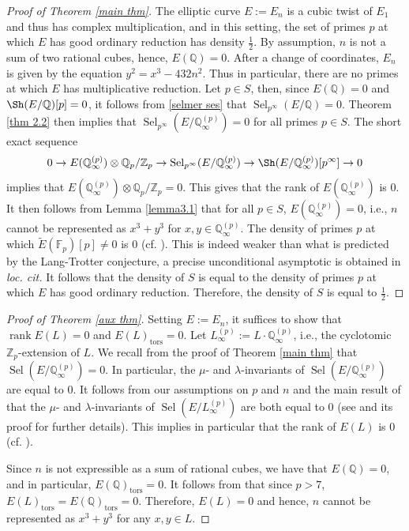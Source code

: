 \documentclass[11pt]{amsart}
\newcommand{\Z}{\mathbb{Z}}
\newcommand{\Q}{\mathbb{Q}}
\newcommand{\F}{\mathbb{F}}
\newcommand{\op}[1]{\operatorname{#1}}
\numberwithin{equation}{section}
\begin{document}
\begin{proof}[Proof of Theorem \ref{main thm}]
    The elliptic curve $E:=E_n$ is a cubic twist of $E_1$ and thus has complex multiplication,  and in this setting, the set of primes $p$ at which $E$ has good ordinary reduction has density $\frac{1}{2}$.  By assumption,  $n$ is not a sum of two rational cubes,  hence,  $E(\Q)=0$.  After a change of coordinates, $E_n$ is given by the equation $y^2=x^3-432 n^2$. Thus in particular, there are no primes at which $E$ has multiplicative reduction. Let $p\in S$,  then,  since $E(\Q)=0$ and $\Sh(E/\Q)[p]=0$, it follows from \eqref{selmer ses} that $\op{Sel}_{p^\infty}(E/\Q)=0$.  Theorem \ref{thm 2.2} then implies that $\op{Sel}_{p^\infty}(E/\Q_\infty^{(p)})=0$ for all primes $p\in S$. The short exact sequence 
    \[0\rightarrow E(\Q_\infty^{(p)})\otimes \Q_p/\Z_p\rightarrow \op{Sel}_{p^\infty}(E/\Q_\infty^{(p)})\rightarrow \Sh(E/\Q_\infty^{(p)})[p^\infty]\rightarrow 0\] implies that $E(\Q_\infty^{(p)})\otimes \Q_p/\Z_p=0$. This gives that the rank of $E(\Q_\infty^{(p)})$ is $0$.  It then follows from Lemma \ref{lemma3.1} that for all $p\in S$,  $E(\Q_\infty^{(p)})=0$,  i.e., $n$ cannot be represented as $x^3+y^3$ for $x,y\in \Q_\infty^{(p)}$. The density of primes $p$ at which $\widetilde{E}(\F_p)[p]\neq 0$ is $0$ (cf. \cite{vkmurty}). This is indeed weaker than what is predicted by the Lang-Trotter conjecture, a precise unconditional asymptotic is obtained in \emph{loc. cit.} It follows that the density of $S$ is equal to the density of primes $p$ at which $E$ has good ordinary reduction.  Therefore,  the density of $S$ is equal to $\frac{1}{2}$. 
\end{proof}

\begin{proof}[Proof of Theorem \ref{aux thm}]
    Setting $E:=E_n$, it suffices to show that $\op{rank} E(L)=0$ and $E(L)_{\op{tors}}=0$. Let $L_\infty^{(p)}:=L\cdot \Q_\infty^{(p)}$, i.e., the cyclotomic $\Z_p$-extension of $L$. We recall from the proof of Theorem \ref{main thm} that $\op{Sel}(E/\Q_\infty^{(p)})=0$. In particular, the $\mu$- and $\lambda$-invariants of $\op{Sel}(E/\Q_\infty^{(p)})$ are equal to $0$. It follows from our assumptions on $p$ and $n$ and the main result of \cite{HachimoriMatsuno} that the $\mu$- and $\lambda$-invariants of $\op{Sel}(E/L_\infty^{(p)})$ are both equal to $0$ (see \cite[Lemma 4.10]{RayASDS} and its proof for further details). This implies in particular that the rank of $E(L)$ is $0$ (cf. \cite[Theorem 1.9]{GreenbergIwasawatheory}).

    \par Since $n$ is not expressible as a sum of rational cubes, we have that $E(\Q)=0$, and in particular, $E(\Q)_{\op{tors}}=0$. It follows from \cite[Theorem 7.2]{GJandNajman} that since $p>7$, $E(L)_{\op{tors}}=E(\Q)_{\op{tors}}=0$. Therefore, $E(L)=0$ and hence, $n$ cannot be represented as $x^3+y^3$ for any $x,y\in L$.
\end{proof}
\end{document}
